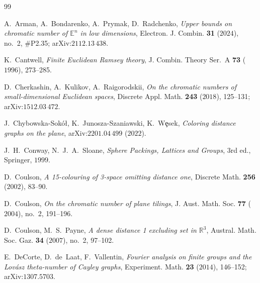 \documentclass[11pt]{article}
\theoremstyle{definition}
\theoremstyle{remark}
\newcommand{\R}{\mathbb{R}}
\newcommand{\E}{\mathbb{E}}
\begin{document}
\tableofcontents
\medskip


















\appendix



\begin{thebibliography}{99}\small

 A.~Arman, A.~Bondarenko, A.~Prymak, D.~Radchenko,
\emph{Upper bounds on chromatic number of $\E^n$ in low dimensions},
Electron. J. Combin. \textbf{31} ($2024$), no.~2, \#P2.35; arXiv:$2112$.$13\,438$.

 K.~Cantwell,
\emph{Finite Euclidean Ramsey theory},
J. Combin. Theory Ser.~A \textbf{73} ($1996$), 273--285.

 D.~Cherkashin, A.~Kulikov, A.~Raigorodskii,
\emph{On the chromatic numbers of small-dimensional Euclidean spaces},
Discrete Appl. Math. \textbf{243} ($2018$), 125--131; arXiv:$1512$.$03\,472$.

 J.~Chybowska-Sok\'o\l{}, K.~Junosza-Szaniawski, K.~W\c{e}sek,
\emph{Coloring distance graphs on the plane},
arXiv:$2201$.$04\,499$ ($2022$).

 J.~H.~Conway, N.~J.~A.~Sloane,
\emph{Sphere Packings, Lattices and Groups}, 3rd ed., Springer, $1999$.

 D.~Coulson,
\emph{A 15-colouring of 3-space omitting distance one},
Discrete Math. \textbf{256} ($2002$), 83--90.

 D.~Coulson,
\emph{On the chromatic number of plane tilings},
J. Aust. Math. Soc. \textbf{77} ($2004$), no.~2, 191--196.

 D.~Coulson, M.~S.~Payne,
\emph{A dense distance 1 excluding set in $\R^3$},
Austral. Math. Soc. Gaz. \textbf{34} ($2007$), no.~2, 97--102.

 E.~DeCorte, D.~de~Laat, F.~Vallentin,
\emph{Fourier analysis on finite groups and the Lov\'asz theta-number of
Cayley graphs},
Experiment. Math. \textbf{23} ($2014$), 146--152; arXiv:$1307$.$5703$.


\end{thebibliography}
\end{document}

